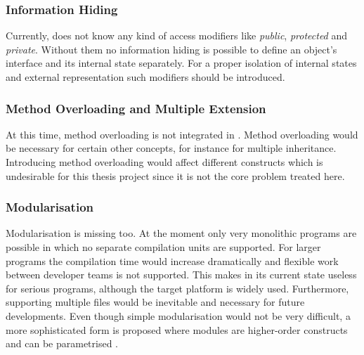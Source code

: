 \subsubsection{Information Hiding}
Currently, \ooplss does not know any kind of access modifiers like
\emph{public}, \emph{protected} and \emph{private}. Without them no
information hiding is possible to define an object's interface
and its internal state separately. For a proper isolation of
internal states and external representation such modifiers should be
introduced.

\subsubsection{Method Overloading and Multiple Extension}
At this time, method overloading is not integrated in \ooplss. Method
overloading would be necessary for certain other concepts, for instance
for multiple inheritance. Introducing method overloading would affect
different constructs which is undesirable for this thesis project since
it is not the core problem treated here.


\subsubsection{Modularisation}
Modularisation is missing too. At the moment only very monolithic programs
are possible in which no separate compilation units are supported. For larger
programs the compilation time would increase dramatically and flexible work between
developer teams is not supported. This makes \ooplss in its current state
useless for serious programs, although the target platform is widely
used. Furthermore, supporting multiple files would be inevitable and
necessary for future developments. Even though simple modularisation would not be
very difficult, a more sophisticated form is proposed where modules are
higher-order constructs and can be parametrised \cite{dreyer_type_2003}.


